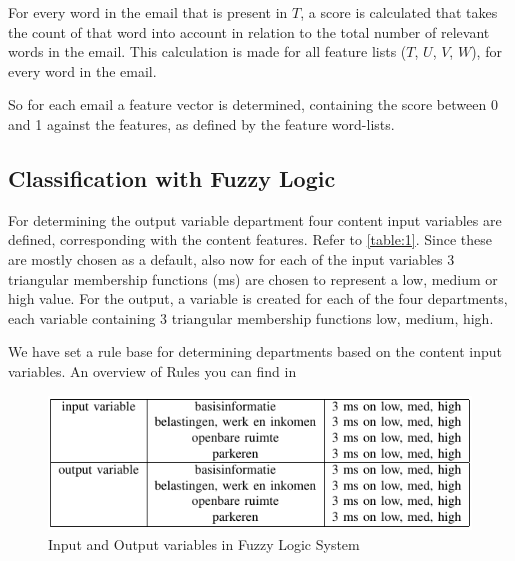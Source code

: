 \documentclass[journal]{IEEEtran}
\begin{document}
For every word in the email that is present in $T$, a score is calculated that takes the count of that word into account in relation to the total number of relevant words in the email. This calculation is made for all feature lists ($T$, $U$, $V$, $W$), for every word in the email. 

So for each email a feature vector is determined, containing the score between 0 and 1 against the features, as defined by the feature word-lists. 

\subsection{Classification with Fuzzy Logic}

For determining the output variable department four content input variables are defined, corresponding with the content features. Refer to \autoref{table:1}. Since these are mostly chosen as a default, also now for each of the input variables 3 triangular membership functions (ms) are chosen to represent a low, medium or high value. For the output, a variable is created for each of the four departments, each variable containing 3 triangular membership functions low, medium, high.

We have set a rule base for determining departments based on the content input variables. An overview of Rules you can find in 

\begin{figure}
	\includegraphics[scale=0.6]{res/inputs_outputs_FLS.png}
	\caption{Input and Output variables in Fuzzy Logic System}
	\label{table:1}
\end{figure}
\end{document}
